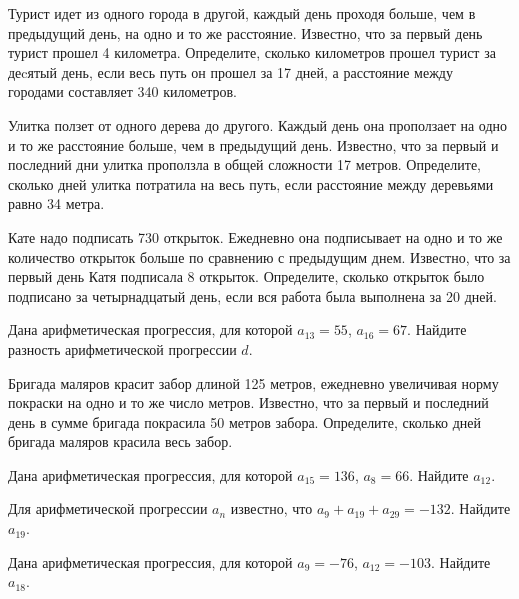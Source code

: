 \documentclass[4apaper]{article}
\begin{document}
\begin{taskBN}{70}
Турист идет из одного города в другой, каждый день проходя больше, чем в предыдущий день, на одно и то же расстояние. Известно, что за первый день турист прошел 4 километра. Определите, сколько километров прошел турист за деcятый день, если весь путь он прошел за 17 дней, а расстояние между городами составляет 340 километров.
\end{taskBN}

\begin{taskBN}{71}
 Улитка ползет от одного дерева до другого. Каждый день она проползает на одно и то же расстояние больше, чем в предыдущий день. Известно, что за первый и последний дни улитка проползла в общей сложности 17 метров. Определите, сколько дней улитка потратила на весь путь, если расстояние между деревьями равно 34 метра.
\end{taskBN}

\begin{taskBN}{72}
Кате надо подписать 730 открыток. Ежедневно она подписывает на одно и то же количество открыток больше по сравнению с предыдущим днем. Известно, что за первый день Катя подписала 8 открыток. Определите, сколько открыток было подписано за четырнадцатый день, если вся работа была выполнена за 20 дней.
\end{taskBN}

\begin{taskBN}{73}
Дана арифметическая прогрессия, для которой $a_{13} = 55$, $a_{16} = 67$. Найдите разность арифметической прогрессии $d$.
\end{taskBN}

\begin{taskBN}{74}
 Бригада маляров красит забор длиной 125 метров, ежедневно увеличивая норму покраски на одно и то же число метров. Известно, что за первый и последний день в сумме бригада покрасила 50 метров забора.  Определите, сколько дней бригада маляров красила весь забор. 
\end{taskBN}

\begin{taskBN}{75}
Дана арифметическая прогрессия, для которой $a_{15} = 136$, $a_{8} = 66$. Найдите $a_{12}$.
\end{taskBN}

\begin{taskBN}{76}
Для арифметической прогрессии ${a_n}$ известно, что $a_{9} + a_{19} + a_{29}= -132$. Найдите $a_{19}$.
\end{taskBN}

\begin{taskBN}{77}
Дана арифметическая прогрессия, для которой $a_{9} = -76$, $a_{12} = -103$. Найдите $a_{18}$.
\end{taskBN}
\end{document}
